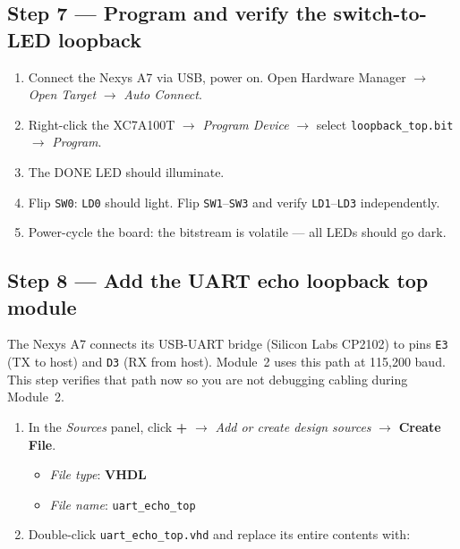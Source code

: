 \documentclass[11pt,letterpaper]{article}
\begin{document}
\subsection{Step 7 --- Program and verify the switch-to-LED loopback}
\begin{enumerate}[leftmargin=2em]
	\item Connect the Nexys A7 via USB, power on. Open Hardware Manager $\to$ \textit{Open Target} $\to$ \textit{Auto Connect}.
	\item Right-click the XC7A100T $\to$ \textit{Program Device} $\to$ select \texttt{loopback\_top.bit} $\to$ \textit{Program}.
	\item The DONE \mbox{LED} should illuminate.
	\item Flip \texttt{SW0}: \texttt{LD0} should light. Flip \texttt{SW1}--\texttt{SW3} and verify \texttt{LD1}--\texttt{LD3} independently.
	\item Power-cycle the board: the bitstream is volatile --- all \mbox{LED}s should go dark.
\end{enumerate}


\newpage
\subsection{Step 8 --- Add the UART echo loopback top module}

The Nexys A7 connects its USB-\mbox{UART} bridge (Silicon Labs CP2102) to pins \texttt{E3} (TX to host) and \texttt{D3} (RX from host). Module~2 uses this path at 115{,}200 baud. This step verifies that path now so you are not debugging cabling during Module~2.

\begin{enumerate}[leftmargin=2em]
	\item In the \textit{Sources} panel, click \textbf{+} $\to$ \textit{Add or create design sources} $\to$ \textbf{Create File}.
	\begin{itemize}[leftmargin=2em]
		\item \textit{File type}: \textbf{VHDL}
		\item \textit{File name}: \texttt{uart\_echo\_top}
	\end{itemize}
	\item Double-click \texttt{uart\_echo\_top.vhd} and replace its entire contents with:
\end{enumerate}
\end{document}
